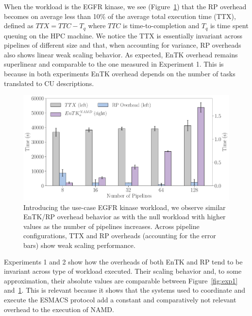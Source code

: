 When the workload is the EGFR kinase, we see (Figure~\ref{fig:exp2}) that the
RP overhead becomes on average less than 10\% of the average total execution
time (TTX), defined as \(TTX = TTC - T_q\) where \(TTC\) is
time-to-completion and \(T_q\) is time spent queuing on the HPC machine. We
notice the TTX is essentially invariant across pipelines of different size
and that, when accounting for variance, RP overheads also shows linear weak
scaling behavior. As expected, EnTK overhead remains superlinear and
comparable to the one measured in Experiment 1. This is because in both
experiments EnTK overhead depends on the number of tasks translated to CU
descriptions.

\begin{figure}
  \centering
  \includegraphics[width=\columnwidth]{FIGURES/namd_workload_overheads.pdf}
  \caption{Introducing the use-case EGFR kinase workload, we observe
  similar EnTK/RP overhead behavior as with the null workload with higher
  values as the number of pipelines increases. Across pipeline
  configurations, TTX and RP overheads (accounting for the error bars) show
  weak scaling performance.}\label{fig:exp2}
\end{figure}

Experiments 1 and 2 show how the overheads of both EnTK and RP tend to be
invariant across type of workload executed. Their scaling behavior and, to
some approximation, their absolute values are comparable between
Figure~\ref{fig:exp1} and~\ref{fig:exp2}. This is relevant because it shows
that the systems used to coordinate and execute the ESMACS protocol add a
constant and comparatively not relevant overhead to the execution of NAMD\@.

